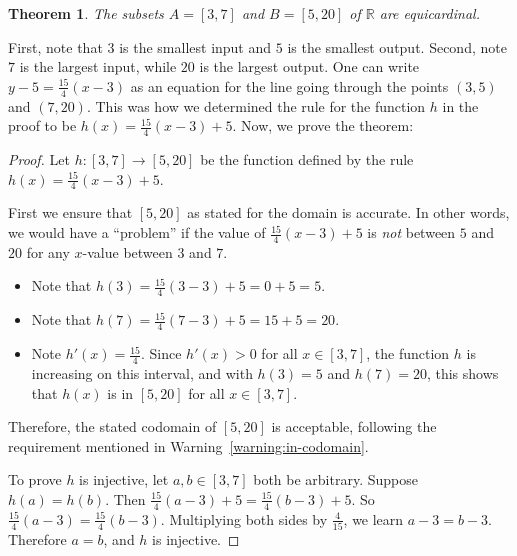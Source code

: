 \documentclass{book}
\newcounter{ekcounter}%
\theoremstyle{ekimcustom}
\newtheorem{theorem}[ekcounter]{Theorem}
\begin{document}
\begin{theorem}
The subsets $A=[3,7]$ and $B=[5,20]$ of $\mathbb{R}$ are equicardinal.
\end{theorem}
First, note that $3$ is the smallest input and $5$ is the smallest output. Second, note $7$ is the largest input, while $20$ is the largest output. One can write $y-5=\frac{15}{4}(x-3)$ as an equation for the line going through the points $(3,5)$ and $(7,20)$. This was how we determined the rule for the function $h$ in the proof to be $h(x)= \frac{15}{4}(x-3)+5$. Now, we prove the theorem:
\begin{proof}
Let $h : [3,7] \to [5,20]$ be the function defined by the rule
$h(x)=\frac{15}{4}(x-3)+5$.

First we ensure that $[5,20]$ as stated for the domain is accurate. In other words, we would have a ``problem'' if the value of $\frac{15}{4}(x-3)+5$ is \emph{not} between $5$ and $20$ for any $x$-value between $3$ and $7$.
\begin{itemize}
    \item Note that $h(3)=\frac{15}{4}(3-3)+5=0+5=5$.
    \item Note that $h(7)=\frac{15}{4}(7-3)+5=15+5=20$.
    \item Note $h'(x)=\frac{15}{4}$. Since $h'(x) > 0$ for all $x \in [3,7]$, the function $h$ is increasing on this interval, and with $h(3)=5$ and $h(7)=20$, this shows that $h(x)$ is in $[5,20]$ for all $x \in [3,7]$.
\end{itemize}
Therefore, the stated codomain of $[5,20]$ is acceptable, following the requirement mentioned in Warning~\ref{warning:in-codomain}.

To prove $h$ is injective, let $a,b \in [3,7]$ both be arbitrary. Suppose $h(a)=h(b)$.
Then $\frac{15}{4}(a-3)+5=\frac{15}{4}(b-3)+5$.
So $\frac{15}{4}(a-3)=\frac{15}{4}(b-3)$.
Multiplying both sides by $\frac{4}{15}$, we learn $a-3=b-3$.
Therefore $a=b$, and $h$ is injective.


\end{proof}
\end{document}
